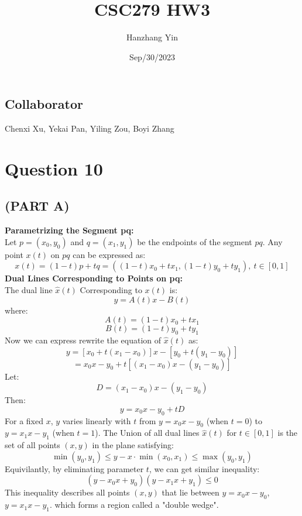 \documentclass{article}
\title{CSC279 HW3}
\author{Hanzhang Yin}
\date{Sep/30/2023}
\begin{document}
\maketitle

\subsection*{Collaborator}
Chenxi Xu, Yekai Pan, Yiling Zou, Boyi Zhang

\section*{Question 10}

\subsection*{(PART A)}
\textbf{Parametrizing the Segment pq: }
\\
Let $p = (x_0, y_0)$ and $q = (x_1, y_1)$ be the endpoints of the segment $pq$. Any point $x(t)$ on $pq$ can 
be expressed as: 
\[ x(t) = (1 - t)p + tq = ((1 - t)x_0 + tx_1, (1 - t)y_0 + ty_1), \ t \in [0, 1] \]
\textbf{Dual Lines Corresponding to Points on pq: }
\\
The dual line $\hat{x}(t)$ Corresponding to $x(t)$ is:
\[ y = A(t)x - B(t) \]
where:
\[ A(t) = (1 - t)x_0 + tx_1 \]
\[ B(t) = (1 - t)y_0 + ty_1 \]
Now we can express rewrite the equation of $\hat{x}(t)$ as:
\[ y = [x_0 + t(x_1 - x_0)]x - [y_0 + t(y_1 - y_0)] \]
\[ = x_0x - y_0 + t[(x_1 - x_0)x - (y_1 - y_0)] \]
Let:
\[ D = (x_1 - x_0)x - (y_1 - y_0) \]
Then:
\[ y = x_0x - y_0 + tD \]
For a fixed $x$, $y$ varies linearly with $t$ from $y = x_0x - y_0$ (when $t = 0$) to $y = x_1x - y_1$ (when $t = 1$).
The Union of all dual lines $\hat{x}(t)$ for $t \in [0,1]$ is the set of all points $(x, y)$ in the plane satisfying:
\[ \min(y_0, y_1) \leq y - x \cdot \min(x_0, x_1) \leq \max(y_0, y_1) \]
Equivilantly, by eliminating parameter $t$, we can get similar inequality:
\[ (y - x_0x + y_0)(y - x_1x + y_1) \leq 0 \]
This inequality describes all points $(x, y)$ that lie between $y = x_0x - y_0$, $y = x_1x - y_1$. 
which forms a region called a "double wedge".

\newpage
\end{document}
